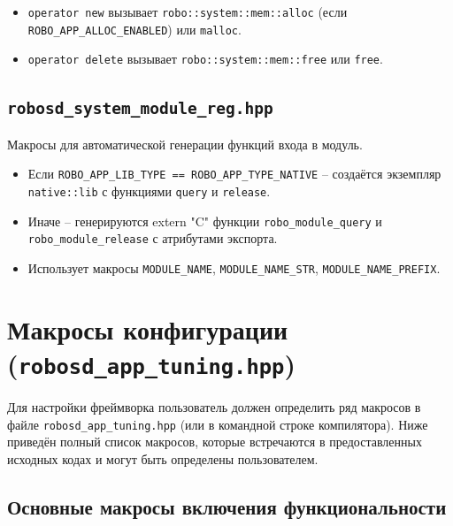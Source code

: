 \documentclass[a4paper,12pt]{article}
\begin{document}
\begin{itemize}
    \item \texttt{operator new} вызывает \texttt{robo::system::mem::alloc} (если \texttt{ROBO\_APP\_ALLOC\_ENABLED}) или \texttt{malloc}.
    \item \texttt{operator delete} вызывает \texttt{robo::system::mem::free} или \texttt{free}.
\end{itemize}

\subsection{\texttt{robosd\_system\_module\_reg.hpp}}

Макросы для автоматической генерации функций входа в модуль.

\begin{itemize}
    \item Если \texttt{ROBO\_APP\_LIB\_TYPE == ROBO\_APP\_TYPE\_NATIVE} -- создаётся экземпляр \texttt{native::lib} с функциями \texttt{query} и \texttt{release}.
    \item Иначе -- генерируются extern "C" функции \texttt{robo\_module\_query} и \texttt{robo\_module\_release} с атрибутами экспорта.
    \item Использует макросы \texttt{MODULE\_NAME}, \texttt{MODULE\_NAME\_STR}, \texttt{MODULE\_NAME\_PREFIX}.
\end{itemize}

\section{Макросы конфигурации (\texttt{robosd\_app\_tuning.hpp})}

Для настройки фреймворка пользователь должен определить ряд макросов в файле \texttt{robosd\_app\_tuning.hpp} (или в командной строке компилятора). Ниже приведён полный список макросов, которые встречаются в предоставленных исходных кодах и могут быть определены пользователем.

\subsection{Основные макросы включения функциональности}
\end{document}
